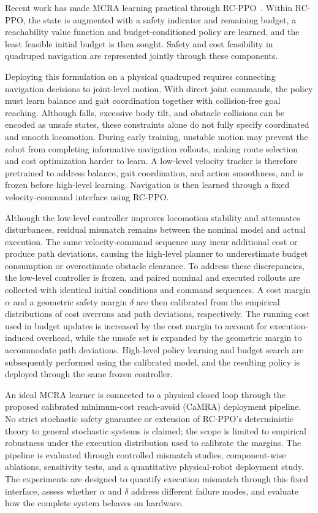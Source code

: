 \documentclass[conference]{IEEEtran}
\begin{document}
Recent work has made MCRA learning practical through RC-PPO~\cite{so2024}.
Within RC-PPO, the state is augmented with a safety indicator and remaining budget,
a reachability value function and budget-conditioned policy are learned, and
the least feasible initial budget is then sought. Safety and cost feasibility in
quadruped navigation are represented jointly through these components.

Deploying this formulation on a physical quadruped requires connecting navigation
decisions to joint-level motion. With direct joint commands, the policy must learn
balance and gait coordination together with collision-free goal reaching. Although
falls, excessive body tilt, and obstacle collisions can be encoded as unsafe
states, these constraints alone do not fully specify coordinated and smooth
locomotion. During early training, unstable motion may prevent the robot from
completing informative navigation rollouts, making route selection and cost
optimization harder to learn. A low-level velocity tracker is therefore pretrained
to address balance, gait coordination, and action smoothness, and is frozen before
high-level learning. Navigation is then learned through a fixed velocity-command
interface using RC-PPO.

Although the low-level controller improves locomotion stability and attenuates
disturbances, residual mismatch remains between the nominal model and actual
execution. The same velocity-command sequence may incur additional cost or produce
path deviations, causing the high-level planner to underestimate budget
consumption or overestimate obstacle clearance. To address these discrepancies,
the low-level controller is frozen, and paired nominal and executed
rollouts are collected with identical initial conditions and command sequences. A
cost margin $\alpha$ and a geometric safety margin $\delta$ are then calibrated from the
empirical distributions of cost overruns and path deviations, respectively. The
running cost used in budget updates is increased by the cost margin to account for
execution-induced overhead, while the unsafe set is expanded by the geometric margin to
accommodate path deviations. High-level policy learning and budget search are
subsequently performed using the calibrated model, and the resulting policy is
deployed through the same frozen controller.

An ideal MCRA learner is connected to a physical closed loop through the proposed
calibrated minimum-cost reach-avoid (CaMRA) deployment pipeline. No strict
stochastic safety guarantee or extension of RC-PPO's deterministic theory to general
stochastic systems is claimed; the scope is limited to empirical robustness under
the execution distribution used to calibrate the margins. The pipeline is evaluated
through controlled mismatch studies, component-wise ablations, sensitivity tests,
and a quantitative physical-robot deployment study. The experiments are designed to
quantify execution mismatch through this fixed interface, assess whether
$\alpha$ and $\delta$ address different failure modes, and evaluate how the
complete system behaves on hardware.
\end{document}

